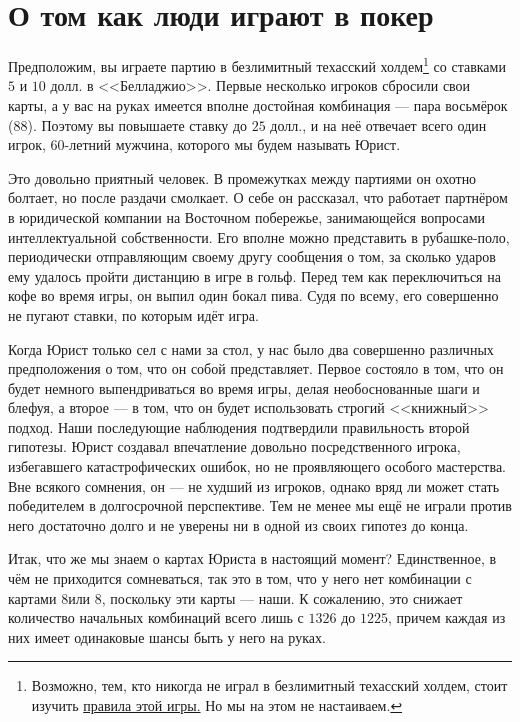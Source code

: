 \section{О том как люди играют в покер}

Предположим, вы играете партию в безлимитный техасский холдем\footnote{Возможно, тем, кто никогда не играл в безлимитный техасский холдем, стоит изучить \href{https://ru.wikipedia.org/wiki/Техасский_холдем}{правила этой игры.} Но мы на этом не настаиваем. } со ставками $5$ и $10$ долл. в <<Белладжио>>. Первые несколько игроков сбросили свои карты, а у вас на руках имеется вполне достойная комбинация --- пара восьмёрок ($8$\clubsuit $8$\spadesuit). Поэтому вы повышаете ставку до $25$ долл., и на неё отвечает всего один игрок, $60$-летний мужчина, которого мы будем называть Юрист.

Это довольно приятный человек. В промежутках между партиями он охотно болтает, но после раздачи смолкает. О себе он рассказал, что работает партнёром в юридической компании на Восточном побережье, занимающейся вопросами интеллектуальной собственности. Его вполне можно представить в рубашке-поло, периодически отправляющим своему другу сообщения о том, за сколько ударов ему удалось пройти дистанцию в игре в гольф. Перед тем как переключиться на кофе во время игры, он выпил один бокал пива. Судя по всему, его совершенно не пугают ставки, по которым идёт игра.

Когда Юрист только сел с нами за стол, у нас было два совершенно различных предположения о том, что он собой представляет. Первое состояло в том, что он будет немного выпендриваться во время игры, делая необоснованные шаги и блефуя, а второе --- в том, что он будет использовать строгий <<книжный>> подход. Наши последующие наблюдения подтвердили правильность второй гипотезы. Юрист создавал впечатление довольно посредственного игрока, избегавшего катастрофических ошибок, но не проявляющего особого мастерства. Вне всякого сомнения, он --- не худший из игроков, однако вряд ли может стать победителем в долгосрочной перспективе. Тем не менее мы ещё не играли против него достаточно долго и не уверены ни в одной из своих гипотез до конца.

Итак, что же мы знаем о картах Юриста в настоящий момент? Единственное, в чём не приходится сомневаться, так это в том, что у него нет комбинации с картами $8$\clubsuit  или $8$\spadesuit, поскольку эти карты --- наши. К сожалению, это снижает количество начальных комбинаций всего лишь с $1326$ до $1225$, причем каждая из них имеет одинаковые шансы быть у него на руках.

